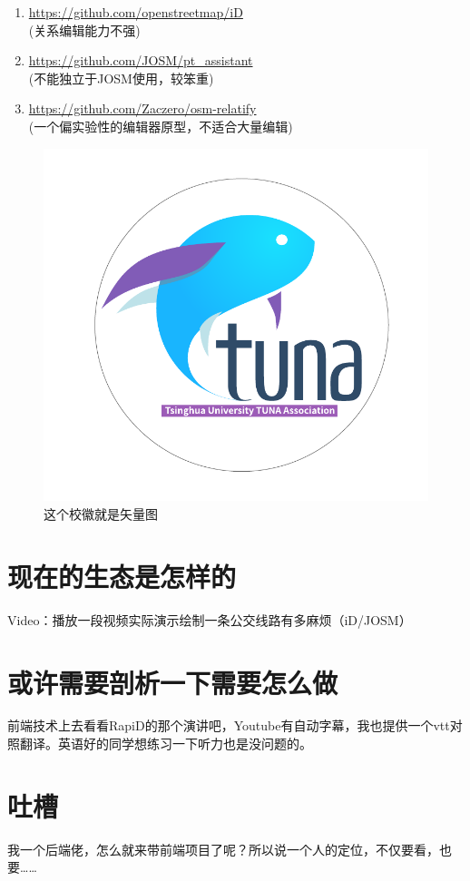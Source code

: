 \documentclass{beamer}
\begin{document}
\begin{frame}
    \begin{enumerate}
        \item \url{https://github.com/openstreetmap/iD} \\
        (关系编辑能力不强)
        \item \url{https://github.com/JOSM/pt_assistant} \\
        (不能独立于JOSM使用，较笨重)
        \item \url{https://github.com/Zaczero/osm-relatify} \\
        (一个偏实验性的编辑器原型，不适合大量编辑)
    \end{enumerate}
    \begin{figure}[htpb]
        \centering
        \includegraphics[width=0.2\linewidth]{figure/tuna.pdf}
        \caption{这个校徽就是矢量图}
    \end{figure}
\end{frame}

\section{现在的生态是怎样的}

\begin{frame}
    Video：播放一段视频实际演示绘制一条公交线路有多麻烦（iD/JOSM）
\end{frame}


\section{或许需要剖析一下需要怎么做}

\begin{frame}
    前端技术上去看看RapiD的那个演讲吧，Youtube有自动字幕，我也提供一个vtt对照翻译。英语好的同学想练习一下听力也是没问题的。
\end{frame}

\section{吐槽}

\begin{frame}
    我一个后端佬，怎么就来带前端项目了呢？所以说一个人的定位，不仅要看，也要……
\end{frame}
\end{document}
